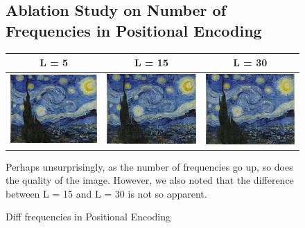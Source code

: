 \documentclass{article}
\begin{document}
\begin{figure}[h]
\subsection{Ablation Study on Number of Frequencies in Positional Encoding}
    \begin{tabular}{c c c}
       L = 5  & L = 15 &  L = 30\\ 
       \midrule
        \includegraphics[width=0.3\linewidth]{pe-5-norm-norm-pred.png} & \includegraphics[width=0.3\linewidth]{no-15-norm-norm-pred.png} &
        \includegraphics[width=0.3\linewidth]{pe-30-norm-norm-pred.png}
    \end{tabular}
    \caption{Diff frequencies in Positional Encoding}
    
Perhaps unsurprisingly, as the number of frequencies go up, so does the quality of the image. However, we also noted that the difference between L = 15 and L = 30 is not so apparent.
\end{figure}
\end{document}
